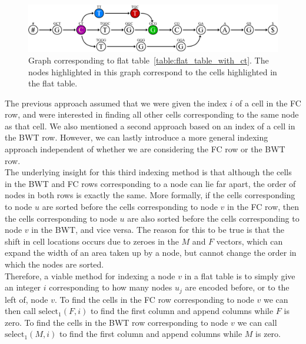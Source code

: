 \documentclass[a4paper,12pt,twoside,BCOR=10mm]{scrbook}
\begin{document}
\begin{figure}[!htb]
\centering
\includegraphics[width=\textwidth]{evo_fig_flat_table_with_ct.pdf}
\caption[Graph corresponding to a flat table]{Graph corresponding to flat table~\ref{table:flat_table_with_ct}. The nodes highlighted in this graph correspond to the cells highlighted in the flat table.} \label{fig:evo_fig_flat_table_with_ct}
\end{figure}

The previous approach assumed that we were given the index $ i $ of a cell in the FC row,
and were interested in finding all other cells corresponding to the same node as that cell.
We also mentioned a second approach based on an index of a cell in the BWT row.
However, we can lastly introduce a more general indexing approach independent of whether we
are considering the FC row or the BWT row. \\
The underlying insight for this third indexing method is that although the cells in the BWT
and FC rows corresponding to a node can lie far apart, the order of nodes in both rows is exactly the same.
More formally, if the cells corresponding to node $ u $ are sorted before the cells corresponding to node $ v $ in
the FC row, then the cells corresponding to node $ u $ are also sorted before the cells corresponding to node $ v $ in
the BWT, and vice versa. The reason for this to be true is that the shift in cell locations occurs due to zeroes in
the $ M $ and $ F $ vectors, which can expand the width of an area taken up by a node, but cannot change the order
in which the nodes are sorted. \\
Therefore, a viable method for indexing a node $ v $ in a flat table
is to simply give an integer $ i $ corresponding to how many nodes $ u_j $ are encoded before, or to
the left of, node $ v $.
To find the cells in the FC row corresponding to node $ v $ we can then call $ \textrm{select}_1 ( F, i ) $ to
find the first column and append columns while $ F $ is zero.
To find the cells in the BWT row corresponding to node $ v $ we can call $ \textrm{select}_1 ( M, i ) $ to
find the first column and append columns while $ M $ is zero.
\end{document}
